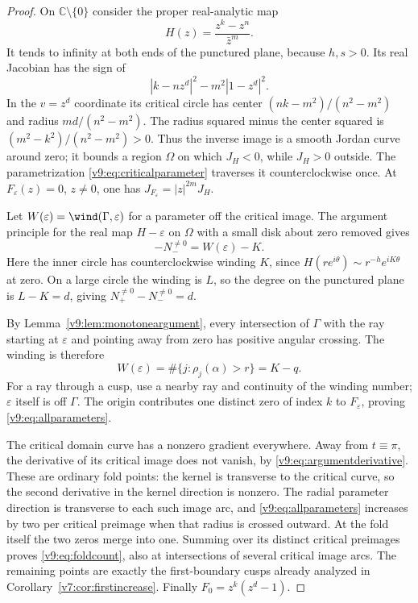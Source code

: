 \documentclass[UTF8,11pt]{ctexart}
\theoremstyle{definition}
\numberwithin{equation}{section}
\newcommand{\C}{\mathbb C}\newcommand{\R}{\mathbb R}
\begin{document}
\begin{proof}
On $\C\setminus\{0\}$ consider the proper real-analytic map
\[
 H(z)=\frac{z^k-z^n}{\bar z^m}.
\]
It tends to infinity at both ends of the punctured plane, because
$h,s>0$. Its real Jacobian has the sign of
\[
 |k-nz^d|^2-m^2|1-z^d|^2.
\]
In the $v=z^d$ coordinate its critical circle has center
$(nk-m^2)/(n^2-m^2)$ and radius $md/(n^2-m^2)$.
The radius squared minus the center squared is
$(m^2-k^2)/(n^2-m^2)>0$.
Thus the inverse image is a smooth Jordan curve around zero;
it bounds a region $\Omega$ on which $J_H<0$, while $J_H>0$
outside. The parametrization \eqref{v9:eq:criticalparameter}
traverses it counterclockwise once. At $F_\varepsilon(z)=0$,
$z\ne0$, one has $J_{F_\varepsilon}=|z|^{2m}J_H$.

Let $W(\varepsilon)=\wind(\Gamma,\varepsilon)$ for a parameter
off the critical image. The argument principle for the real map
$H-\varepsilon$ on $\Omega$ with a small disk about zero removed
gives
\[
 -N^{\ne0}_-=W(\varepsilon)-K.
\]
Here the inner circle has counterclockwise winding $K$, since
$H(re^{i\theta})\sim r^{-h}e^{iK\theta}$ at zero. On a large
circle the winding is $L$, so the degree on the punctured plane
is $L-K=d$, giving $N^{\ne0}_+-N^{\ne0}_-=d$.

By Lemma~\ref{v9:lem:monotoneargument}, every intersection of
$\Gamma$ with the ray starting at $\varepsilon$ and pointing
away from zero has positive angular crossing. The winding is
therefore
\[
 W(\varepsilon)=\#\{j:\rho_j(\alpha)>r\}=K-q.
\]
For a ray through a cusp, use a nearby ray and continuity of the
winding number; $\varepsilon$ itself is off $\Gamma$.
The origin contributes one distinct zero of index $k$ to
$F_\varepsilon$, proving \eqref{v9:eq:allparameters}.

The critical domain curve has a nonzero gradient everywhere.
Away from $t\equiv\pi$, the derivative of its critical image
does not vanish, by \eqref{v9:eq:argumentderivative}. These are
ordinary fold points: the kernel is transverse to the critical
curve, so the second derivative in the kernel direction is nonzero.
The radial parameter direction is transverse to each such image
arc, and \eqref{v9:eq:allparameters} increases by two per critical
preimage when that radius is crossed outward. At the fold itself
the two zeros merge into one. Summing over its distinct critical
preimages proves \eqref{v9:eq:foldcount}, also at intersections
of several critical image arcs. The remaining points are exactly
the first-boundary cusps already analyzed in
Corollary~\ref{v7:cor:firstincrease}. Finally $F_0=z^k(z^d-1)$.
\end{proof}
\end{document}
